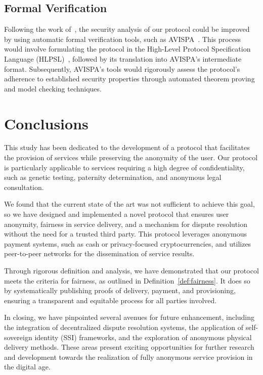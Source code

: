 \documentclass[pdftex,twocolumn,epjc3]{svjour3}
\begin{document}
{\subsection{Formal Verification}\label{sec:formal-verification}
Following the work of~\cite{birjoveanuFormalVerificationMultiparty2022}, the security analysis of our protocol could be improved by using automatic formal verification tools, such as AVISPA~\cite{armandoAVISPAToolAutomated2005}. This process would involve formulating the protocol in the High-Level Protocol Specification Language (HLPSL)~\cite{chevalierHighLevelProtocol2004}, followed by its translation into AVISPA's intermediate format. Subsequently, AVISPA's tools would rigorously assess the protocol's adherence to established security properties through automated theorem proving and model checking techniques.

\section{Conclusions}\label{sec:conclusion}

This study has been dedicated to the development of a protocol that facilitates the provision of services while preserving the anonymity of the user. Our protocol is particularly applicable to services requiring a high degree of confidentiality, such as genetic testing, paternity determination, and anonymous legal consultation.

We found that the current state of the art was not sufficient to achieve this goal, so we have designed and implemented a novel protocol that ensures user anonymity, fairness in service delivery, and a mechanism for dispute resolution without the need for a trusted third party. This protocol leverages anonymous payment systems, such as cash or privacy-focused cryptocurrencies, and utilizes peer-to-peer networks for the dissemination of service results.

Through rigorous definition and analysis, we have demonstrated that our protocol meets the criteria for fairness, as outlined in Definition~\ref{def:fairness}. It does so by systematically publishing proofs of delivery, payment, and provisioning, ensuring a transparent and equitable process for all parties involved.

In closing, we have pinpointed several avenues for future enhancement, including the integration of decentralized dispute resolution systems, the application of self-sovereign identity (SSI) frameworks, and the exploration of anonymous physical delivery methods. These areas present exciting opportunities for further research and development towards the realization of fully anonymous service provision in the digital age.

}
\end{document}
